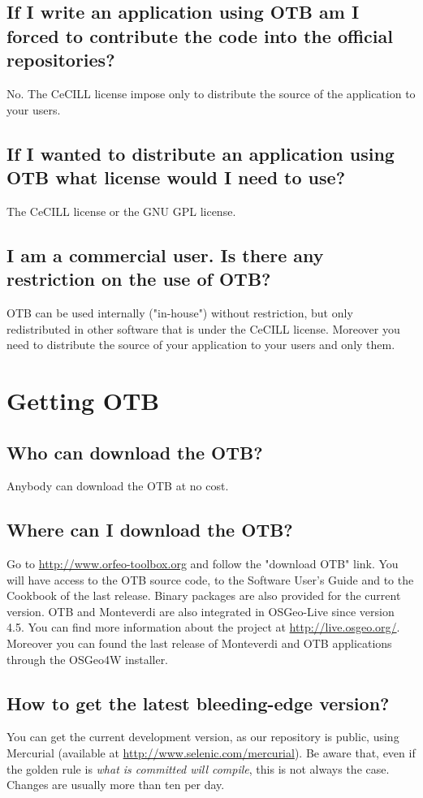 \subsection{If I write an application using OTB am I forced to contribute the code into the official repositories?}
No. The CeCILL license impose only to distribute the source of the application to your users.

\subsection{If I wanted to distribute an application using OTB what license would I need to use?}
The CeCILL license or the GNU GPL license.

\subsection{I am a commercial user. Is there any restriction on the
  use of OTB?}
OTB can be used internally ("in-house") without restriction, but only
redistributed in other software that is under the CeCILL license. 
Moreover you need to distribute the source of your application to your
users and only them.

\section{Getting OTB}

\subsection{Who can download the OTB?}
Anybody can download the OTB at no cost.

\subsection{Where can I download the OTB?}
Go to \url{http://www.orfeo-toolbox.org}
 and follow the "download OTB" link. You will have access to the OTB
source code, to the Software User's Guide and to the Cookbook of the last release. 
Binary packages are also provided for the current version.
OTB and Monteverdi are also integrated in OSGeo-Live since version 4.5.
You can find more information about the project at \url{http://live.osgeo.org/}. 
Moreover you can found the last release of Monteverdi and OTB applications through 
the OSGeo4W installer. 

\subsection{How to get the latest bleeding-edge version?}\label{sec:FAQMercurial}
You can get the current development version, as our repository is public, using Mercurial (available at \url{http://www.selenic.com/mercurial}). Be aware that, even if the golden rule is {\em what is committed will compile}, this is not always the case. Changes are usually more than ten per day.

